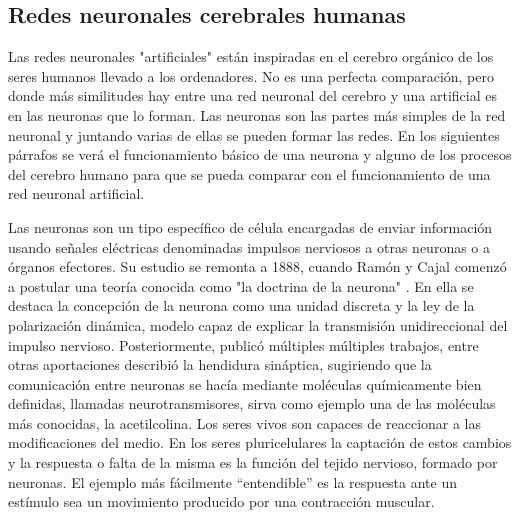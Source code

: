 \subsection{Redes neuronales cerebrales humanas}

Las redes neuronales "artificiales" están inspiradas en el cerebro orgánico de los seres humanos llevado a los ordenadores. No es una perfecta comparación, pero donde más similitudes hay entre una red neuronal del cerebro y una artificial es en las neuronas que lo forman\cite{kinsley}. Las neuronas son las partes más simples de la red neuronal y juntando varias de ellas se pueden formar las redes. En los siguientes párrafos se verá el funcionamiento básico de una neurona y alguno de los procesos del cerebro humano para que se pueda comparar con el funcionamiento de una red neuronal artificial.
\newline

Las neuronas son un tipo específico de célula encargadas de enviar información usando señales eléctricas  denominadas impulsos nerviosos a otras neuronas o a órganos efectores. Su estudio se remonta a 1888, cuando Ramón y Cajal comenzó a postular una teoría conocida como "la doctrina de la neurona" \cite{cajal}. En ella se destaca la concepción de la neurona como una unidad discreta y la ley de la polarización dinámica, modelo capaz de explicar la transmisión unidireccional del impulso nervioso. Posteriormente, publicó múltiples múltiples trabajos, entre otras aportaciones describió la hendidura sináptica, sugiriendo que la comunicación entre neuronas se hacía mediante moléculas químicamente bien definidas, llamadas neurotransmisores, sirva como ejemplo una de las moléculas más conocidas, la acetilcolina\cite{loewi}. Los seres vivos son capaces de reaccionar a las modificaciones del medio. En los seres pluricelulares la captación de estos cambios y la respuesta o falta de la misma es la función del tejido nervioso, formado por neuronas. El ejemplo más fácilmente “entendible” es la respuesta ante un estímulo sea un movimiento producido por una contracción muscular.\cite{robertis}
\newline

